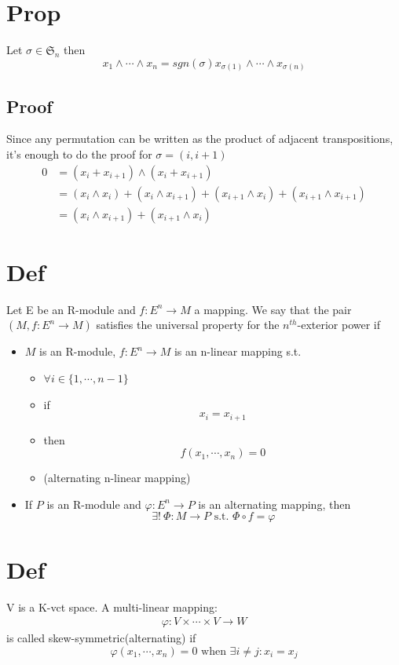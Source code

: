\documentclass{book}
\begin{document}
\section{Prop}
Let $\sigma\in \mathfrak{S}_n$ then $$x_1\wedge\cdots\wedge x_n=sgn(\sigma) x_{\sigma(1)}\wedge\cdots\wedge x_{\sigma(n)}$$
\subsection*{Proof}
Since any permutation can be written as the product of adjacent transpositions, it's enough to do the proof for $\sigma=(i,i+1)$
$$
\begin{aligned}
    0 &=(x_i+x_{i+1})\wedge(x_i+x_{i+1})\\
    &=(x_i\wedge x_i)+(x_i\wedge x_{i+1})+(x_{i+1}\wedge x_i)+(x_{i+1}\wedge x_{i+1})\\
    &=(x_i\wedge x_{i+1})+(x_{i+1}\wedge x_i)
\end{aligned}
$$
\section{Def}
Let E be an R-module and $f:E^n\rightarrow M$ a mapping.
We say that the pair $(M,f:E^n\rightarrow M)$ satisfies the universal property for the $n^{th}$-exterior power if
\begin{itemize}
    \item $M$ is an R-module, $f:E^n\rightarrow M$ is an n-linear mapping s.t.
    \begin{itemize}
        \item[ ] $\forall i\in \{1,\cdots,n-1\}$
        \item[] if$$x_i=x_{i+1}$$
        \item[] then$$f(x_1,\cdots,x_n)=0$$
        \item[] (alternating n-linear mapping)
    \end{itemize}
    \item If $P$ is an R-module and $\varphi:E^n\rightarrow P$ is an alternating mapping, then 
    $$\exists !\ \Phi:M\rightarrow P\text{ s.t. }\Phi\circ f=\varphi$$
\end{itemize}
\section{Def}
V is a K-vct space. A multi-linear mapping:
$$\begin{aligned}
    \varphi:V\times\cdots\times V\rightarrow W
\end{aligned}$$
is called skew-symmetric(alternating) if
$$\varphi(x_1,\cdots,x_n)=0\text{ when }\exists i\neq j:x_i=x_j$$
\end{document}
